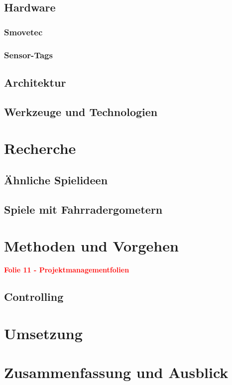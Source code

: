 \section{Hardware}
\subsection{Smovetec}
\subsection{Sensor-Tags}
\section{Architektur}
\section{Werkzeuge und Technologien}
 
\chapter{Recherche}
\section{Ähnliche Spielideen}
\section{Spiele mit Fahrradergometern}

\chapter{Methoden und Vorgehen}
\textcolor{red}{\textbf{Folie 11 - Projektmanagementfolien}}
\section{Controlling}



\chapter{Umsetzung}

\chapter{Zusammenfassung und Ausblick}